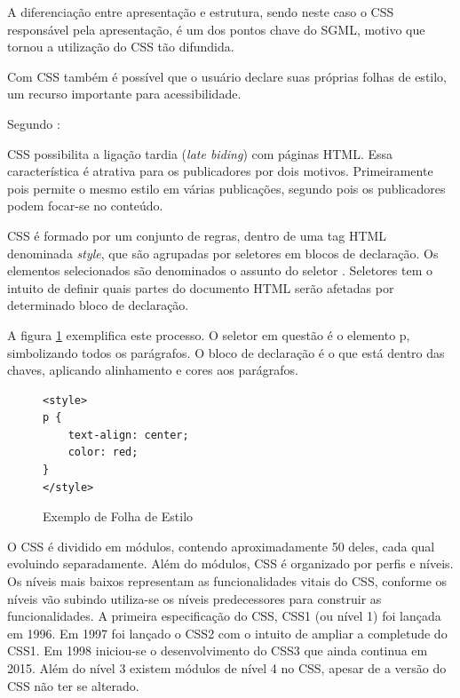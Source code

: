 \documentclass[
12pt,
a4paper,
portuges,
draft
]{report}
\renewenvironment{quote}
               {\list{}{\rightmargin\leftmargin}%
                \item\relax\fontsize{10}{12}}
               {\endlist}
\begin{document}
A diferenciação entre apresentação e estrutura, sendo neste caso o
CSS responsável pela apresentação, é um dos pontos chave do SGML,
motivo que tornou a utilização do CSS tão difundida.

Com CSS também é possível que o usuário declare suas próprias
folhas de estilo, um recurso importante para acessibilidade.

Segundo \cite[pp. 23--24]{CascadingStyleSheets}:

\begin{quote}
CSS possibilita a ligação tardia (\textit{late biding}) com
páginas HTML. Essa característica é atrativa para os publicadores
por dois motivos. Primeiramente pois permite o mesmo estilo em várias
publicações, segundo pois os publicadores podem focar-se no conteúdo.
\end{quote}

CSS é formado por um conjunto de regras,
dentro de uma tag HTML denominada \textit{style}, que são agrupadas
por seletores em blocos de declaração. Os elementos selecionados são
denominados o assunto do seletor \autocite{cssSelectors}. Seletores tem
o intuito de definir quais partes do documento HTML serão afetadas por
determinado bloco de declaração.

A figura \ref{fig:CSSSample} exemplifica este processo. O seletor em
questão é o elemento p, simbolizando todos os parágrafos. O bloco de declaração
é o que está dentro das chaves, aplicando alinhamento e cores aos parágrafos.

\begin{figure}
\centering
\begin{verbatim}
<style>
p {
    text-align: center;
    color: red;
}
</style>
\end{verbatim}
\caption{Exemplo de Folha de Estilo}
\label{fig:CSSSample}
\end{figure}

O CSS é dividido em módulos, contendo aproximadamente 50 deles, cada
qual evoluindo separadamente. Além do módulos, CSS é organizado por perfis e níveis.
Os níveis mais baixos representam as funcionalidades vitais do CSS, conforme os níveis
vão subindo utiliza-se os níveis predecessores para construir as funcionalidades.
A primeira especificação do CSS, CSS1 (ou nível 1) foi lançada em 1996. Em 1997 foi lançado o
 CSS2 com o intuito de ampliar a completude do CSS1. Em 1998 iniciou-se o desenvolvimento
 do CSS3 que ainda continua em 2015. Além do nível 3 existem módulos de nível 4 no CSS, apesar de a
versão do CSS não ter se alterado.
\end{document}
